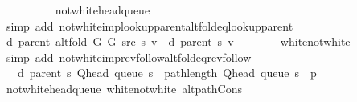 \begin{isabellebody}
\ \ \ \ \ \ \ \ \isamarkupfalse%
\ not{\isacharunderscore}{\kern0pt}white{\isacharunderscore}{\kern0pt}head{\isacharunderscore}{\kern0pt}queue\isanewline
\ \ \ \ \ \ \ \ \isamarkupfalse%
\ {\isacharparenleft}{\kern0pt}simp\ add{\isacharcolon}{\kern0pt}\ not{\isacharunderscore}{\kern0pt}white{\isacharunderscore}{\kern0pt}imp{\isacharunderscore}{\kern0pt}lookup{\isacharunderscore}{\kern0pt}parent{\isacharunderscore}{\kern0pt}alt{\isacharunderscore}{\kern0pt}fold{\isacharunderscore}{\kern0pt}eq{\isacharunderscore}{\kern0pt}lookup{\isacharunderscore}{\kern0pt}parent{\isacharparenright}{\kern0pt}\isanewline
\ \ \ \ \isamarkupfalse%
\isanewline
\ \ \ \ \isanewline
\ \ \ \ \isamarkupfalse%
\ {\isachardoublequoteopen}d\ {\isacharparenleft}{\kern0pt}parent\ {\isacharparenleft}{\kern0pt}alt{\isacharunderscore}{\kern0pt}fold\ G{}\ G{}\ src\ s{\isacharparenright}{\kern0pt}{\isacharparenright}{\kern0pt}\ v\ {\isacharequal}{\kern0pt}\ d\ {\isacharparenleft}{\kern0pt}parent\ s{\isacharparenright}{\kern0pt}\ v{\isachardoublequoteclose}\isanewline
\ \ \ \ \ \ \isamarkupfalse%
\ white{\isacharunderscore}{\kern0pt}not{\isacharunderscore}{\kern0pt}white\isanewline
\ \ \ \ \ \ \isamarkupfalse%
\ {\isacharparenleft}{\kern0pt}simp\ add{\isacharcolon}{\kern0pt}\ not{\isacharunderscore}{\kern0pt}white{\isacharunderscore}{\kern0pt}imp{\isacharunderscore}{\kern0pt}rev{\isacharunderscore}{\kern0pt}follow{\isacharunderscore}{\kern0pt}alt{\isacharunderscore}{\kern0pt}fold{\isacharunderscore}{\kern0pt}eq{\isacharunderscore}{\kern0pt}rev{\isacharunderscore}{\kern0pt}follow{\isacharparenright}{\kern0pt}\isanewline
\ \ \ \ \isamarkupfalse%
\ \isamarkupfalse%
\ {\isachardoublequoteopen}{\isachardot}{\kern0pt}{\isachardot}{\kern0pt}{\isachardot}{\kern0pt}\ {\isasymle}\ d\ {\isacharparenleft}{\kern0pt}parent\ s{\isacharparenright}{\kern0pt}\ {\isacharparenleft}{\kern0pt}Q{\isacharunderscore}{\kern0pt}head\ {\isacharparenleft}{\kern0pt}queue\ s{\isacharparenright}{\kern0pt}{\isacharparenright}{\kern0pt}\ {\isacharplus}{\kern0pt}\ path{\isacharunderscore}{\kern0pt}length\ {\isacharparenleft}{\kern0pt}Q{\isacharunderscore}{\kern0pt}head\ {\isacharparenleft}{\kern0pt}queue\ s{\isacharparenright}{\kern0pt}\ {\isacharhash}{\kern0pt}\ p{\isacharparenright}{\kern0pt}{\isachardoublequoteclose}\isanewline
\ \ \ \ \ \ \isamarkupfalse%
\ not{\isacharunderscore}{\kern0pt}white{\isacharunderscore}{\kern0pt}head{\isacharunderscore}{\kern0pt}queue\ white{\isacharunderscore}{\kern0pt}not{\isacharunderscore}{\kern0pt}white\ alt{\isacharunderscore}{\kern0pt}path{\isacharunderscore}{\kern0pt}Cons\isanewline

\end{isabellebody}
